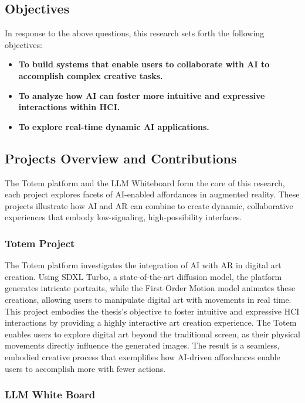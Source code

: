 \subsection{Objectives}

In response to the above questions, this research sets forth the following objectives:

\begin{itemize}
    \item \textbf{To build systems that enable users to collaborate with AI to accomplish complex creative tasks.}
    \item \textbf{To analyze how AI can foster more intuitive and expressive interactions within HCI.}
    \item \textbf{To explore real-time dynamic AI applications.}
\end{itemize}


\subsection{Projects Overview and Contributions}

The Totem platform and the LLM Whiteboard form the core of this research, each project explores facets of AI-enabled affordances in augmented reality.
These projects illustrate how AI and AR can combine to create dynamic, collaborative experiences that embody low-signaling, high-possibility interfaces.

\subsubsection{Totem Project}

The Totem platform investigates the integration of AI with AR in digital art creation.
Using SDXL Turbo, a state-of-the-art diffusion model, the platform generates intricate portraits, while the First Order Motion model animates these creations, allowing users to manipulate digital art with movements in real time. 
This project embodies the thesis’s objective to foster intuitive and expressive HCI interactions by providing a highly interactive art creation experience.
The Totem enables users to explore digital art beyond the traditional screen, as their physical movements directly influence the generated images.
The result is a seamless, embodied creative process that exemplifies how AI-driven affordances enable users to accomplish more with fewer actions.

\subsubsection{LLM White Board}

